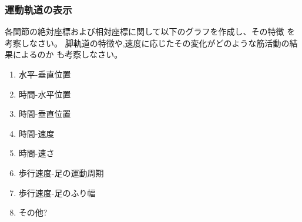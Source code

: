 \documentclass{jarticle}
\begin{document}

\subsubsection{運動軌道の表示}

各関節の絶対座標および相対座標に関して以下のグラフを作成し、その特徴
を考察しなさい。
脚軌道の特徴や,速度に応じたその変化がどのような筋活動の結果によるのか
も考察しなさい。
\begin{enumerate}
\item 水平-垂直位置
\item 時間-水平位置
\item 時間-垂直位置
\item 時間-速度
\item 時間-速さ
\item 歩行速度-足の運動周期
\item 歩行速度-足のふり幅
\item その他?
\end{enumerate}
\end{document}
